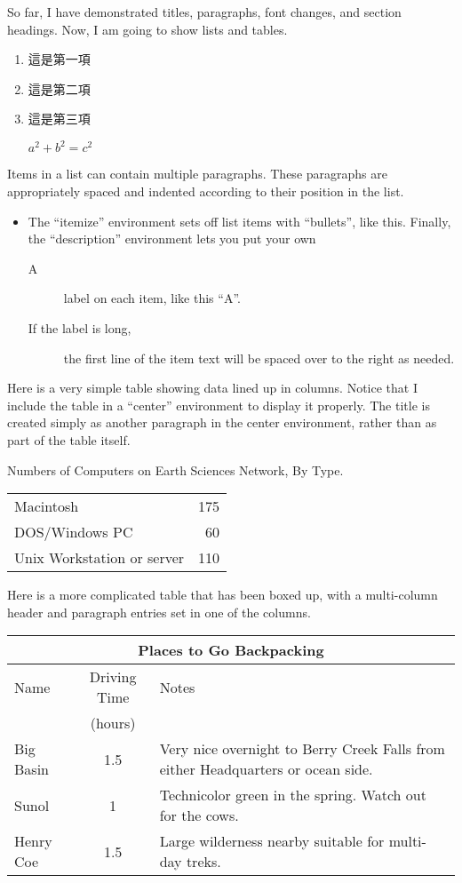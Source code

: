 \documentclass{article}
\begin{document}
So far, I have demonstrated titles, paragraphs, font changes, and
section headings.
Now, I am going to show lists and tables. 

\begin{enumerate}
\item
這是第一項
\item 
這是第二項
\item
這是第三項

$a^2+b^2=c^2$

\end{enumerate}

Items in a list can contain multiple paragraphs.
These paragraphs are appropriately spaced and indented according to their
position in the list.
  \begin{itemize}
  \item The ``itemize'' environment sets off list items with ``bullets'',
like this. Finally, the ``description'' environment lets you put your own
    \begin{description}
    \item[A] label on each item, like this ``A''.
    \item[If the label is long,] the first line of the item text will
be spaced over to the right as needed.
    \end{description} 
  \end{itemize}

Here is a very simple table showing data lined up in columns.
Notice that I include the table in a ``center'' environment to display
it properly.
The title is created simply as another paragraph in the center environment,
rather than as part of the table itself.

\begin{center}
Numbers of Computers on Earth Sciences Network, By Type.

\begin{tabular}{lr}
Macintosh&175\\
DOS/Windows PC&60\\
Unix Workstation or server&110\\
\end{tabular}
\end{center} 


Here is a more complicated table that has been boxed up, with a multi-column
header and paragraph entries set in one of the columns.
\begin{center}
\begin{tabular}{|l|c|p{3.5in}|}
\hline
\multicolumn{3}{|c|}{Places to Go Backpacking}\\ \hline
Name&Driving Time&Notes\\
&(hours)&\\ \hline
Big Basin&1.5&Very nice overnight to Berry Creek Falls from
either Headquarters or ocean side.\\ \hline
Sunol&1&Technicolor green in the spring. Watch out for the cows.\\ \hline
Henry Coe&1.5&Large wilderness nearby suitable for multi-day treks.\\ \hline
\end{tabular}
\end{center} 
\end{document}
